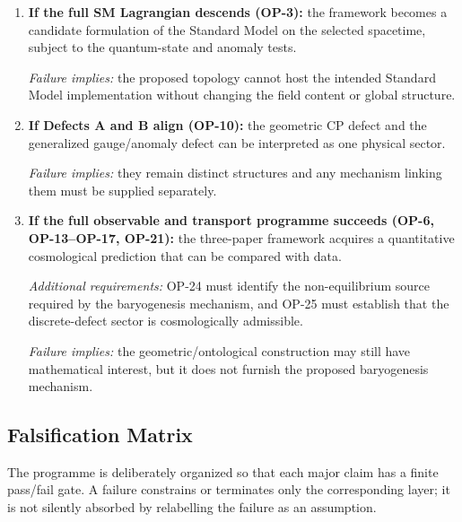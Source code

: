 \documentclass[11pt]{article}
\theoremstyle{canonmath}
\theoremstyle{canonpostulate}
\theoremstyle{canonclaim}
\begin{document}
\begin{enumerate}
\emph{Failure implies:} the nodal theorem remains mathematically valid under its hypotheses but lacks a physical order parameter in the proposed theory.

\item \textbf{If the full SM Lagrangian descends (OP-3):} the framework becomes a candidate formulation of the Standard Model on the selected spacetime, subject to the quantum-state and anomaly tests.

\emph{Failure implies:} the proposed topology cannot host the intended Standard Model implementation without changing the field content or global structure.

\item \textbf{If Defects A and B align (OP-10):} the geometric CP defect and the generalized gauge/anomaly defect can be interpreted as one physical sector.

\emph{Failure implies:} they remain distinct structures and any mechanism linking them must be supplied separately.

\item \textbf{If the full observable and transport programme succeeds (OP-6, OP-13--OP-17, OP-21):} the three-paper framework acquires a quantitative cosmological prediction that can be compared with data.

\emph{Additional requirements:} OP-24 must identify the non-equilibrium source required by the baryogenesis mechanism, and OP-25 must establish that the discrete-defect sector is cosmologically admissible.

\emph{Failure implies:} the geometric/ontological construction may still have mathematical interest, but it does not furnish the proposed baryogenesis mechanism.
\end{enumerate}

\subsection*{Falsification Matrix}
The programme is deliberately organized so that each major claim has a finite pass/fail gate. A failure constrains or terminates only the corresponding layer; it is not silently absorbed by relabelling the failure as an assumption.
\end{document}
